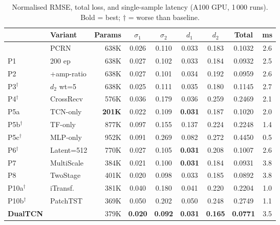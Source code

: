 \documentclass[journal]{IEEEtran}
\begin{document}
\begin{table}[t]
  \centering
  \footnotesize
  \caption{Normalised RMSE, total loss, and single-sample latency
  (A100 GPU, 1\,000 runs). Bold = best; $\dagger$ = worse than
  baseline.}
  \label{tab:supp_rmse}
  \begin{tabular}{llrcccccc}
    \toprule
    & Variant & Params & $\sigma_1$ & $\sigma_2$ & $d_1$ & $d_2$
              & Total & ms \\
    \midrule
    & PCRN        & 638K & 0.026 & 0.110 & 0.033 & 0.183
                  & 0.1032 & 2.6 \\
    P1  & 200 ep      & 638K & 0.027 & 0.102 & 0.033 & 0.184
        & 0.0932 & 2.5 \\
    P2  & +amp-ratio  & 638K & 0.027 & 0.101 & 0.034 & 0.192
        & 0.0959 & 2.6 \\
    P3$^\dagger$
        & $d_2$ wt=5  & 638K & 0.025 & 0.111 & 0.035 & 0.180
        & 0.1145 & 2.7 \\
    P4$^\dagger$
        & CrossRecv   & 576K & 0.036 & 0.179 & 0.036 & 0.259
        & 0.2469 & 2.1 \\
    P5a & TCN-only    & \textbf{201K} & 0.022 & 0.109
        & \textbf{0.031} & 0.187 & 0.1020 & 2.0 \\
    P5b$^\dagger$
        & TF-only     & 877K & 0.097 & 0.155 & 0.137 & 0.224
        & 0.2248 & 1.4 \\
    P5c$^\dagger$
        & MLP-only    & 952K & 0.091 & 0.269 & 0.082 & 0.272
        & 0.4450 & 0.5 \\
    P6$^\dagger$
        & Latent=512  & 770K & 0.027 & 0.105 & \textbf{0.031}
        & 0.208 & 0.1007 & 2.6 \\
    P7  & MultiScale  & 384K & 0.021 & 0.100 & \textbf{0.031}
        & 0.184 & 0.0931 & 3.8 \\
    P8  & TwoStage    & 401K & 0.020 & 0.098 & 0.033 & 0.185
        & 0.0892 & 3.8 \\
    P10a$^\dagger$
        & iTransf.    & 381K & 0.040 & 0.180 & 0.041 & 0.220
        & 0.2204 & 1.0 \\
    P10b$^\dagger$
        & PatchTST    & 369K & 0.050 & 0.202 & 0.050 & 0.248
        & 0.2749 & 1.1 \\
    \textbf{DualTCN}
        &             & 379K & \textbf{0.020} & \textbf{0.092}
        & \textbf{0.031} & \textbf{0.165}
        & \textbf{0.0771} & 3.5 \\
    \bottomrule
  \end{tabular}
\end{table}
\end{document}
